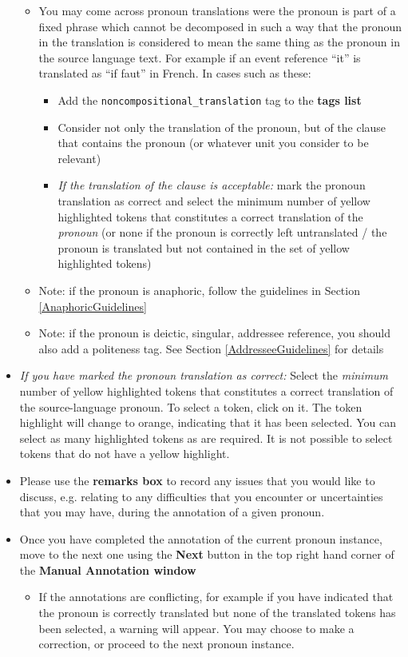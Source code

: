 \documentclass[11pt]{article} %
\newcommand\tag[1]{\texttt{#1}}
\begin{document}
\begin{itemize}
\begin{itemize}
    \item You may come across pronoun translations were the pronoun is part of a fixed phrase which cannot be decomposed in such a way that the pronoun in the translation is considered to mean the same thing as the pronoun in the source language text. For example if an event reference ``it'' is translated as ``if faut'' in French. In cases such as these:
    	\begin{itemize}
		\item Add the \tag{noncompositional\_translation} tag to the \textbf{tags list}
		\item Consider not only the translation of the pronoun, but of the clause that contains the pronoun (or whatever unit you consider to be relevant)
		\item \textit{If the translation of the clause is acceptable:} mark the pronoun translation as correct and select the minimum number of yellow highlighted tokens that constitutes a correct translation of the \textit{pronoun} (or none if the pronoun is correctly left untranslated / the pronoun is translated but not contained in the set of yellow highlighted tokens)
	\end{itemize}
    \item Note: if the pronoun is anaphoric, follow the guidelines in Section \ref{AnaphoricGuidelines}
    \item Note: if the pronoun is deictic, singular, addressee reference, you should also add a politeness tag. See Section \ref{AddresseeGuidelines} for details
  \end{itemize}
  \item \textit{If you have marked the pronoun translation as correct:} Select the \textit{minimum} number of yellow highlighted tokens that constitutes a correct translation of the source-language pronoun. To select a token, click on it. The token highlight will change to orange, indicating that it has been selected. You can select as many highlighted tokens as are required. It is not possible to select tokens that do not have a yellow highlight.
  \item Please use the \textbf{remarks box} to record any issues that you would like to discuss, e.g. relating to any difficulties that you encounter or uncertainties that you may have, during the annotation of a given pronoun.
  \item Once you have completed the annotation of the current pronoun instance, move to the next one using the \textbf{Next} button in the top right hand corner of the \textbf{Manual Annotation window}
  \begin{itemize}
    \item If the annotations are conflicting, for example if you have indicated that the pronoun is correctly translated but none of the translated tokens has been selected, a warning will appear. You may choose to make a correction, or proceed to the next pronoun instance.
  \end{itemize}
\end{itemize}
\end{document}
